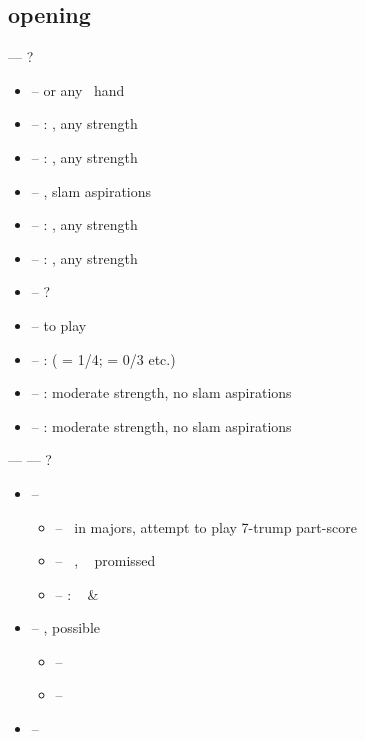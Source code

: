 \subsection{ opening}

 --- ?
\begin{itemize}
  \item {} --   or any \inv\ hand
  \item {} -- : , any strength
  \item {} -- : , any strength
  \item {} --  , slam aspirations
  \item {} -- : , any strength
  \item {} -- : , any strength
  \item {} -- ?
  \item {} -- \nat\/ to play
  \item {} -- :  ( = 1/4;  = 0/3 etc.)
  \item {} -- :  moderate strength, no slam aspirations
  \item {} -- :  moderate strength, no slam aspirations
\end{itemize}
\vspace{1em}

\noindent
{} ---  --- ?
\begin{itemize}
  \item {} -- \art\ \no\ 
  \begin{itemize}
    \item {} -- \so\ in majors, attempt to play 7-trump part-score
    \item {} -- \nat\ \inv, \no\  promissed
    \item {} -- : \gf\  \& 
  \end{itemize}
  \item {} -- , possible 
  \begin{itemize}
    \item {} -- \inv\ 
    \item {} -- \inv\ \no\ 
  \end{itemize}
  \item {} -- 
\end{itemize}
\vspace{1em}

